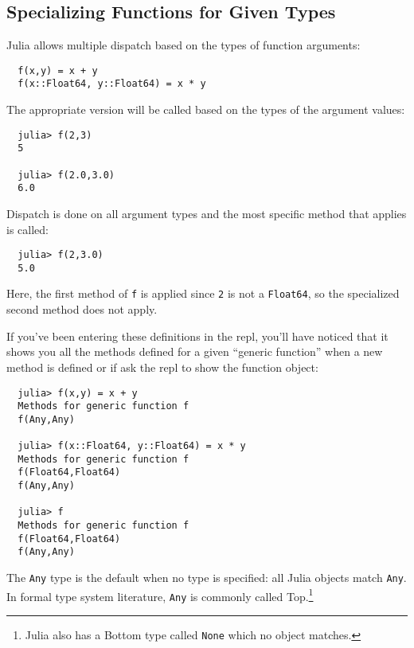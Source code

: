 \documentclass{article}
\begin{document}
\subsection{Specializing Functions for Given Types}

Julia allows multiple dispatch based on the types of function arguments:
\begin{verbatim}
  f(x,y) = x + y
  f(x::Float64, y::Float64) = x * y
\end{verbatim}
The appropriate version will be called based on the types of the argument values:
\begin{verbatim}
  julia> f(2,3)
  5

  julia> f(2.0,3.0)
  6.0
\end{verbatim}
Dispatch is done on all argument types and the most specific method that applies is called:
\begin{verbatim}
  julia> f(2,3.0)
  5.0
\end{verbatim}
Here, the first method of \verb|f| is applied since \verb|2| is not a \verb|Float64|, so the specialized second method does not apply.

If you've been entering these definitions in the repl, you'll have noticed that it shows you all the methods defined for a given ``generic function'' when a new method is defined or if ask the repl to show the function object:
\begin{verbatim}
  julia> f(x,y) = x + y
  Methods for generic function f
  f(Any,Any)

  julia> f(x::Float64, y::Float64) = x * y
  Methods for generic function f
  f(Float64,Float64)
  f(Any,Any)

  julia> f
  Methods for generic function f
  f(Float64,Float64)
  f(Any,Any)
\end{verbatim}
The \verb|Any| type is the default when no type is specified:
all Julia objects match \verb|Any|.
In formal type system literature, \verb|Any| is commonly called Top.\footnote{Julia also has a Bottom type called \texttt{None} which no object matches.}
\end{document}
